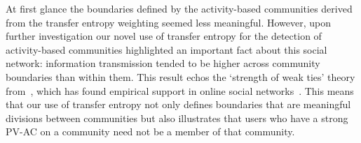 

At first glance the boundaries defined by the activity-based communities derived from the transfer entropy weighting seemed less meaningful. However, upon further investigation our novel use of transfer entropy for the detection of activity-based communities highlighted an important fact about this social network: information transmission tended to be higher across community boundaries than within them. This result echos the `strength of weak ties' theory from~\cite{granovetter1973strength}, which has found empirical support in online social networks~\cite{grabowicz2012social}. This means that our use of transfer entropy not only defines boundaries that are meaningful divisions between communities but also illustrates that users who have a strong PV-AC on a community need not be a member of that community. 


